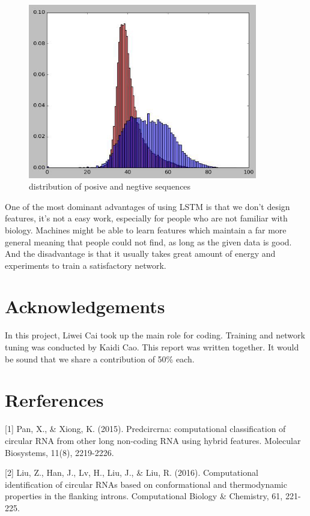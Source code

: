 \documentclass[10pt,a4paper]{article}
\begin{document}
\begin{spacing}{1.5}
		\begin{figure}[H]
			\centering
			\includegraphics[width = 10cm]{pic/2.jpg}
			\caption{distribution of posive and negtive sequences}
		\end{figure}
		
		One of the most dominant advantages of using LSTM is that we don't design features, it's not a easy work, especially for people who are not familiar with biology. Machines might be able to learn features which maintain a far more general meaning that people could not find, as long as the given data is good. And the disadvantage is that it usually takes great amount of energy and experiments to train a satisfactory network.
		
		\section*{Acknowledgements}
		In this project, Liwei Cai took up the main role for coding. Training and network tuning was conducted by Kaidi Cao. This report was written together. It would be sound that we share a contribution of 50\% each. 
		
		
		\newpage
		
		\section*{Rerferences}
		
		[1] Pan, X., \& Xiong, K. (2015). Predcircrna: computational classification of circular RNA from other long non-coding RNA using hybrid features. Molecular Biosystems, 11(8), 2219-2226.
		
		[2] Liu, Z., Han, J., Lv, H., Liu, J., \& Liu, R. (2016). Computational identification of circular RNAs based on conformational and thermodynamic properties in the flanking introns. Computational Biology \& Chemistry, 61, 221-225.
		

\end{spacing}
\end{document}
